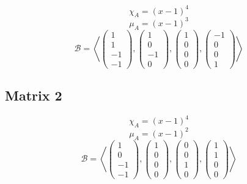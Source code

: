 \documentclass[10pt,a4paper]{article}
\begin{document}
\begin{equation}
\chi_{A} = (x - 1)^{4}
\end{equation}
\begin{equation}
\mu_{A} = (x - 1)^{3}
\end{equation}
\begin{equation}
\mathcal{B} = \left \langle
\begin{pmatrix}
1\\1\\-1\\-1
\end{pmatrix},
\begin{pmatrix}
1\\0\\-1\\0
\end{pmatrix},
\begin{pmatrix}
1\\0\\0\\0
\end{pmatrix},
\begin{pmatrix}
-1\\0\\0\\1
\end{pmatrix}
\right \rangle
\end{equation}

\subsection*{Matrix 2}

\begin{equation}
\chi_{A} = (x - 1)^{4}
\end{equation}
\begin{equation}
\mu_{A} = (x - 1)^{2}
\end{equation}
\begin{equation}
\mathcal{B} = \left \langle
\begin{pmatrix}
1\\0\\-1\\-1
\end{pmatrix},
\begin{pmatrix}
1\\0\\0\\0
\end{pmatrix},
\begin{pmatrix}
0\\0\\1\\0
\end{pmatrix},
\begin{pmatrix}
1\\1\\0\\0
\end{pmatrix}
\right \rangle
\end{equation}
\end{document}

